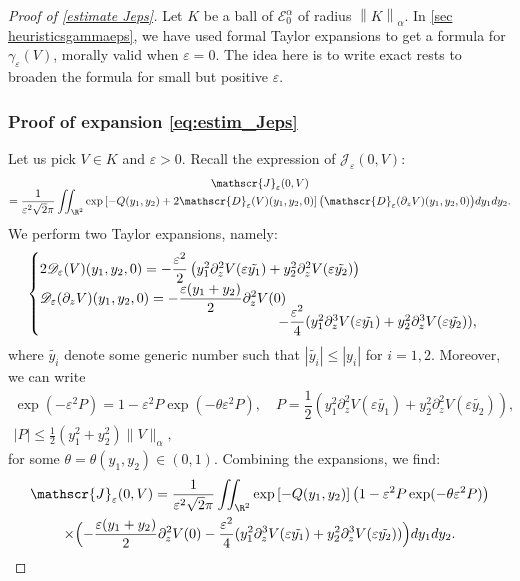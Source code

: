 \documentclass[JEP,XML,SOM,Unicode]{cedram}
\let\mathcal\mathscr
\theoremstyle{plain}
\theoremstyle{definition}
\newcommand{\D}{\mathcal{D}_\eps}
\newcommand{\Je}{\mathcal{J}_\eps}
\let\eps\varepsilon
\let\ds\displaystyle
\newcommand{\abs}[1]{\left\lvert#1\right\rvert}
\newcommand{\nalph}[1]{\left\lVert#1\right\rVert_\alpha}
\newcommand{\Eaz}{\mathcal{E}^\alpha_0}
\begin{document}
\begin{proof}[Proof of \cref{estimate Jeps}]
Let $K$ be a ball of $\Eaz$ of radius $\nalph{K}$. In \cref{sec heuristicsgammaeps}, we have used formal Taylor expansions to get a formula for $\gamma_\eps(V)$, morally valid when $\eps = 0$. The idea here is to write exact rests to broaden the formula for small but positive $\eps$.

\subsubsection*{Proof of expansion \eqref{eq:estim_Jeps}}
Let us pick $V\in K$ and $\eps>0$. Recall the expression of $\Je(0,V)$:
\begin{multline*}
\Je(0,V)\\[-5pt]
= \dfrac{1}{\eps^2 \sqrt{2}\pi } \ds \iint_{\R^2} \exp \left[-Q(y_1,y_2) + 2 \D(V)(y_1,y_2,0) \right] \big(\D(\partial_z V)(y_1,y_2,0) \big) d y_1 d y_2.
\end{multline*}
We perform two Taylor expansions, namely:
\begin{equation}\label{eq:Taylor1}
\begin{cases}
2 \D(V)(y_1,y_2,0) = - \dfrac{\eps^2}{2}\left(y_1^2 \partial_z^2 V(\eps \tilde{y_1}) + y_2^2 \partial_z^2 V(\eps \tilde{y_2}) \right)\\
\ds \D(\partial_z V)(y_1,y_2,0) = - \dfrac{\eps (y_1+y_2)}{2} \partial_z^2 V(0)\\[-5pt]
\hspace*{6cm}- \dfrac{\eps^2}{4} (y_1^2 \partial_z^3 V(\eps \tilde{y_1}) + y_2^2 \partial_z^3 V(\eps \tilde{y_2})),
\end{cases}
\end{equation}
where $\tilde{y_i}$ denote some generic number such that $\abs{\tilde{y_i}} \leq \abs{y_i}$ for $i=1,2$.
Moreover, we can write
\begin{equation}\label{eq:P}
\begin{gathered}
\exp(-\eps^2 P) = 1 -\eps^2 P \exp(-\theta\eps^2 P), \quad P = \dfrac{1}{2}\left(y_1^2 \partial_z^2 V(\eps \tilde{y_1}) + y_2^2 \partial_z^2 V(\eps \tilde{y_2}) \right),\\ |P|\leq \frac12 \left (y_1^2 + y_2^2\right) \|V\|_\alpha,
\end{gathered}
\end{equation}
for some $\theta = \theta(y_1,y_2)\in (0,1)$. Combining the expansions, we find:
\begin{multline*}
\Je(0,V) = \dfrac{1}{\eps^2 \sqrt{2}\pi} \ds \iint_{\R^2} \exp \left[-Q(y_1,y_2)\right ] \left (1 -\eps^2 P \exp(-\theta\eps^2 P) \right) \\ \times\Bigl (- \dfrac{\eps (y_1+y_2)}{2} \partial_z^2 V(0)- \dfrac{\eps^2}{4} (y_1^2 \partial_z^3 V(\eps \tilde{y_1}) + y_2^2 \partial_z^3 V(\eps \tilde{y_2})) \Bigr) d y_1 d y_2.

\end{multline*}
\end{proof}
\end{document}

